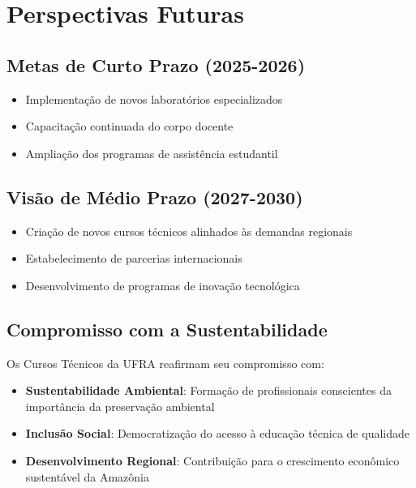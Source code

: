 \documentclass[
  12pt,
  letterpaper,
]{report}
\providecommand{\tightlist}{%
  \setlength{\itemsep}{0pt}\setlength{\parskip}{0pt}}\usepackage{longtable,booktabs,array}
\begin{document}
\section{Perspectivas Futuras}\label{perspectivas-futuras}

\subsection{Metas de Curto Prazo
(2025-2026)}\label{metas-de-curto-prazo-2025-2026}

\begin{itemize}
\tightlist
\item
  Implementação de novos laboratórios especializados
\item
  Capacitação continuada do corpo docente
\item
  Ampliação dos programas de assistência estudantil
\end{itemize}

\subsection{Visão de Médio Prazo
(2027-2030)}\label{visuxe3o-de-muxe9dio-prazo-2027-2030}

\begin{itemize}
\tightlist
\item
  Criação de novos cursos técnicos alinhados às demandas regionais
\item
  Estabelecimento de parcerias internacionais
\item
  Desenvolvimento de programas de inovação tecnológica
\end{itemize}

\subsection{Compromisso com a
Sustentabilidade}\label{compromisso-com-a-sustentabilidade}

Os Cursos Técnicos da UFRA reafirmam seu compromisso com:

\begin{itemize}
\tightlist
\item
  \textbf{Sustentabilidade Ambiental}: Formação de profissionais
  conscientes da importância da preservação ambiental
\item
  \textbf{Inclusão Social}: Democratização do acesso à educação técnica
  de qualidade
\item
  \textbf{Desenvolvimento Regional}: Contribuição para o crescimento
  econômico sustentável da Amazônia
\end{itemize}
\end{document}
